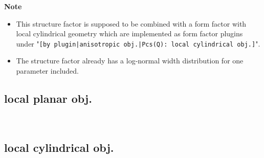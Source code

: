 \noindent
\textbf{Note}
\begin{itemize}
  \item This structure factor is supposed to be combined with a form factor with local cylindrical geometry which are implemented as form factor plugins
under "\texttt{[by plugin|anisotropic obj.|Pcs(Q): local cylindrical obj.]}".
\item The structure factor already has a log-normal width distribution for one parameter included.
\end{itemize}

\subsection{local planar  obj.} ~\\
\label{plugin:LocalPlanar)}

\subsection{local cylindrical obj.} ~\\
\label{plugin:LocalCylindrical)}
